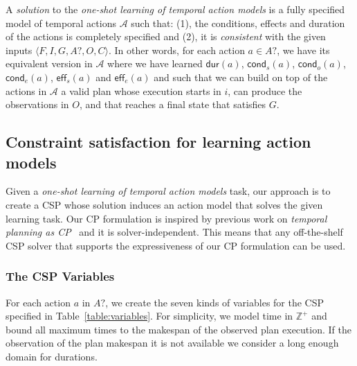 \documentclass{ecai}
\newcommand{\tup}[1]{{\langle #1 \rangle}}
\newcommand{\eff}{\mathsf{eff}}    %
\newcommand{\cond}{\mathsf{cond}}  %
\newcommand{\dur}{\mathsf{dur}}    %
\begin{document}
A {\em solution} to the {\em one-shot learning of temporal action models} is a fully specified model of temporal actions $\mathcal{A}$ such that: (1), the conditions, effects and duration of the actions is completely specified and (2), it is {\em consistent} with the given inputs $\tup{F,I,G,A?,O,C}$. In other words, for each action $a \in A?$, we have its equivalent version in $\mathcal{A}$ where we have learned $\dur(a)$, $\cond_s(a)$, $\cond_o(a)$, $\cond_e(a)$, $\eff_s(a)$ and $\eff_e(a)$ and such that we can build on top of the actions in $\mathcal{A}$ a valid plan whose execution starts in $i$, can produce the observations in $O$, and that reaches a final state that satisfies $G$. 

\subsection{Constraint satisfaction for learning action models}
\label{subsec:CPformulation}

Given a {\em one-shot learning of temporal action models} task, our approach is to create a CSP whose solution induces an action model that solves the given learning task. Our CP formulation is inspired by previous work on {\em temporal planning as CP}~\cite{vidal2006branching,garrido2009constraint} and it is solver-independent. This means that any off-the-shelf CSP solver that supports the expressiveness of our CP formulation can be used.

\subsubsection{The CSP Variables}
For each action $a$ in $A?$, we create the seven kinds of variables for the CSP specified in Table~\ref{table:variables}. For simplicity, we model time in $\mathbb{Z}^+$ and bound all maximum times to the makespan of the observed plan execution. If the observation of the plan makespan it is not available we consider a long enough domain for durations.
\end{document}
